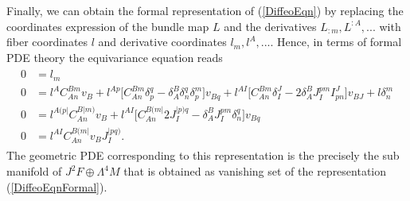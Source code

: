 Finally, we can obtain the formal representation of (\ref{DiffeoEqn}) by replacing the coordinates expression of the bundle map $L$ and the derivatives $L_{:m},L^{:A},...$ with fiber coordinates $l$ and derivative coordinates $l_m,l^A,...$. Hence, in terms of formal PDE theory the equivariance equation reads
\begin{align}\label{DiffeoEqnFormal}
\begin{aligned}
    0 &= l_{m} \\
    0 &= l^{A} C_{An}^{Bm} v_B + l^{Ap} \bigl[ C_{An}^{Bm} \delta_p^q - \delta_A^B \delta_n^q\delta^m_p \bigr] v_{Bq} + l^{AI} \bigl[ C_{An}^{Bm} \delta_I^J - 2 \delta_A^B J_I^{pm} I^J_{pn}  \bigr] v_{BJ} + l \delta^m_n \\
    0 &= l^{A(p\vert}C_{An}^{B \vert m)} v_B + l^{ AI} \bigl[ C_{An}^{B(m\vert} 2 J_I^{\vert p) q} - \delta^B_A J_I ^{pm} \delta_n^q \bigr] v_{Bq} \\
    0 &= l^{AI} C_{An}^{B(m\vert} v_B J_I^{\vert p q )}.
    \end{aligned}
\end{align}
The geometric PDE corresponding to this representation is the precisely the sub manifold of $J^2F\oplus \Lambda^4M$ that is obtained as vanishing set of the representation (\ref{DiffeoEqnFormal}).

